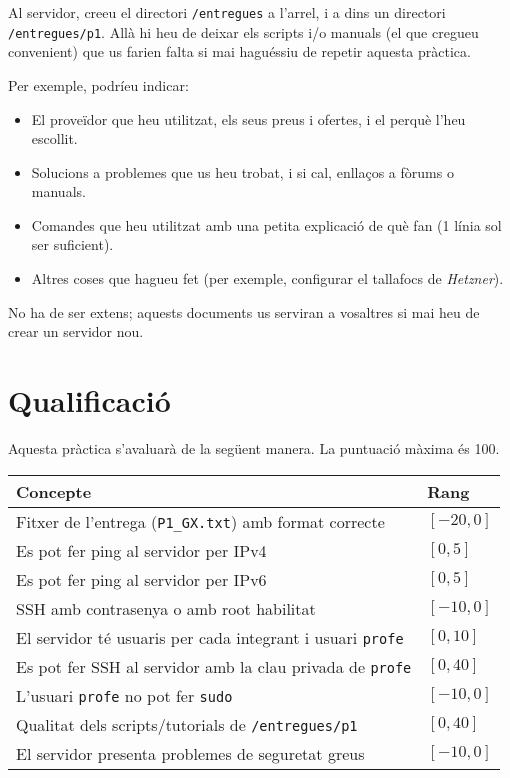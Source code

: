 \documentclass{practicaitic}
\begin{document}
Al servidor, creeu el directori \texttt{/entregues} a l'arrel, i a dins un
directori \texttt{/entregues/p1}. Allà hi heu de deixar els scripts i/o manuals
(el que cregueu convenient) que us farien falta si mai haguéssiu de repetir
aquesta pràctica.

Per exemple, podríeu indicar:
\begin{itemize}
  \item El proveïdor que heu utilitzat, els seus preus i ofertes, i el perquè l'heu escollit.
  \item Solucions a problemes que us heu trobat, i si cal, enllaços a fòrums o manuals.
  \item Comandes que heu utilitzat amb una petita explicació de què fan (1 línia sol ser suficient).
  \item Altres coses que hagueu fet (per exemple, configurar el tallafocs de \textit{Hetzner}).
\end{itemize}

No ha de ser extens; aquests documents us serviran a vosaltres si mai heu de
crear un servidor nou.

\section{Qualificació}

Aquesta pràctica s'avaluarà de la següent manera. La puntuació màxima és 100.

\begin{center}
  \begin{tabular}{ll}
  \hline
  Concepte & Rang \\ \hline
  Fitxer de l'entrega (\texttt{P1\_GX.txt}) amb format correcte & $[-20, 0]$ \\
  Es pot fer ping al servidor per IPv4 & $[0, 5]$ \\
  Es pot fer ping al servidor per IPv6 & $[0, 5]$ \\
  SSH amb contrasenya o amb root habilitat & $[-10, 0]$ \\
  El servidor té usuaris per cada integrant i usuari \texttt{profe} & $[0, 10]$ \\
  Es pot fer SSH al servidor amb la clau privada de \texttt{profe} & $[0, 40]$ \\
  L'usuari \texttt{profe} no pot fer \texttt{sudo} & $[-10,0]$ \\
  Qualitat dels scripts/tutorials de \texttt{/entregues/p1} & $[0,40]$ \\
  El servidor presenta problemes de seguretat greus & $[-10,0]$ \\
  \hline
  \end{tabular}
\end{center}
\end{document}
